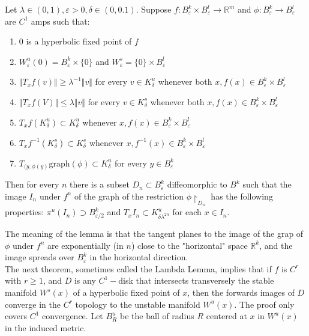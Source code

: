 \begin{lem}

Let $\lambda \in (0,1), \varepsilon >0, \delta \in (0,0.1)$. Suppose $f: B^k_{\varepsilon} \times B^l_{\varepsilon} \to \mathbb{R}^m$ and $\phi: B^k_{\varepsilon} \to B^l_{\varepsilon}$ are $C^1$ amps such that:

\begin{enumerate}
    \item 0 is a hyperbolic fixed point of $f$
    \item $W^u_{\varepsilon}(0) = B^k_{\varepsilon} \times \{0\}$ and $W^s_{\varepsilon} = \{0 \} \times B^l_{\varepsilon}$
    \item $\Vert T_xf(v) \Vert \geq \lambda^{-1} \Vert v \Vert$ for every $v \in K^u_{\delta}$ whenever both $x, f(x) \in B^k_{\varepsilon} \times B^l_{\varepsilon}$
    \item $\Vert T_xf (V) \Vert \leq \lambda \Vert v \Vert$ for every $v \in K^s_{\delta}$ whenever both $x, f(x) \in B^k_{\varepsilon} \times B^l_{\varepsilon}$
    \item $T_xf(K^u_{\delta}) \subset K^u_{\delta}$ whenever $x, f(x) \in B^k_{\varepsilon} \times B^l_{\varepsilon}$
    \item $T_xf^{-1} (K^s_{\delta}) \subset K^s_{\delta}$ whenever $x, f^{-1}(x) \in B^k_{\varepsilon} \times B^l_{\varepsilon}$
    \item $T_{(y,\phi(y)}\mathrm{graph}(\phi) \subset K^u_{\delta}$ for every $y \in B^k_{\varepsilon}$
\end{enumerate}

Then for every $n$ there is a subset $D_n \subset B^k_{\varepsilon}$ diffeomorphic to $B^k$ such that the image $I_n$ under $f^n$ of the graph of the restriction $\phi \restriction_{D_n}$ has the following properties: $\pi^u(I_n) \supset B^k_{\varepsilon /2}$ and $T_xI_n \subset K^u_{\delta \lambda^{2n}}$ for each $x \in I_n$.
\end{lem}

The meaning of the lemma is that the tangent planes to the image of the grap of $\phi$ under $f^n$ are exponentially (in $n$) close to the "horizontal" space $\mathbb{R}^k$, and the image spreads over $B^k_{\varepsilon}$ in the horizontal direction. \\
\indent The next theorem, sometimes called the Lambda Lemma, implies that if $f$ is $C^r$ with $r \geq 1$, and $D$ is any $C^1-$disk that intersects transversely the stable manifold $W^s(x)$ of a hyperbolic fixed point of $x$, then the forwards images of $D$ converge in the $C^r$ topology to the unstable manifold $W^u(x)$. The proof only covers $C^1$ convergence. Let $B^u_R$ be the ball of radius $R$ centered at $x$ in $W^u(x)$ in the induced metric. \\

